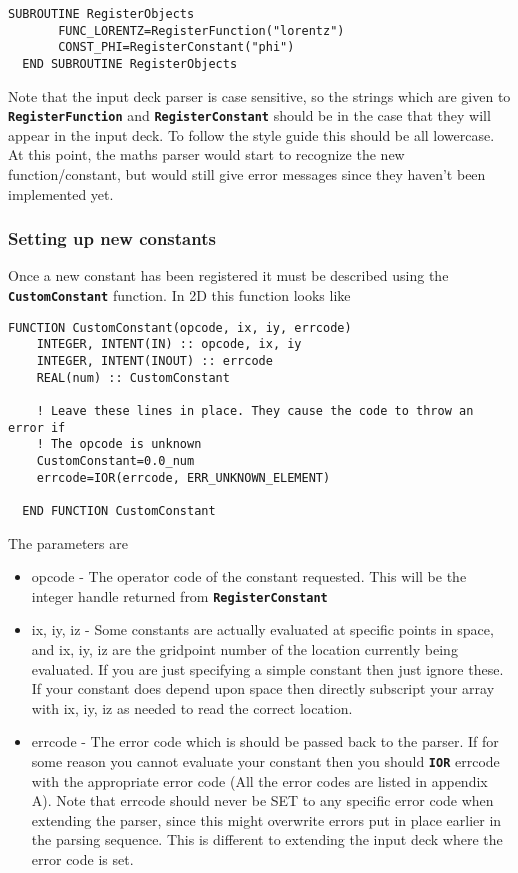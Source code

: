 \documentclass[12pt,a4paper]{article}
\newcommand{\simpleboxverbatim}{\begin{Verbatim}[obeytabs=true,frame=single,
  framerule=0.5mm,rulecolor=\color{warwickmid},formatcom=\color{black}]}
\newcommand{\inlinecode}[1]{{\color{warwickred} \bf\texttt{#1}}}
\newcommand{\EPOCH}{{\color{warwickdark}\fontfamily{phv}\selectfont{EPOCH}}}
\begin{document}
\simpleboxverbatim
  SUBROUTINE RegisterObjects
       FUNC_LORENTZ=RegisterFunction("lorentz")
       CONST_PHI=RegisterConstant("phi")
  END SUBROUTINE RegisterObjects
\end{Verbatim}

Note that the input deck parser is case sensitive, so the strings which are
given to \inlinecode{RegisterFunction} and \inlinecode{RegisterConstant}
should be in the case that they will appear in the input deck. To follow the
{\EPOCH} style guide this should be all lowercase. At this point, the maths
parser would start to recognize the new function/constant, but would still
give error messages since they haven't been implemented yet.

\subsubsection{Setting up new constants}

Once a new constant has been registered it must be described using the
\inlinecode{CustomConstant} function. In 2D this function looks like

\simpleboxverbatim
  FUNCTION CustomConstant(opcode, ix, iy, errcode)
    INTEGER, INTENT(IN) :: opcode, ix, iy
    INTEGER, INTENT(INOUT) :: errcode
    REAL(num) :: CustomConstant

    ! Leave these lines in place. They cause the code to throw an error if
    ! The opcode is unknown
    CustomConstant=0.0_num
    errcode=IOR(errcode, ERR_UNKNOWN_ELEMENT)

  END FUNCTION CustomConstant
\end{Verbatim}

The parameters are

\begin{itemize}
\item opcode - The operator code of the constant requested. This will be the
  integer handle returned from \inlinecode{RegisterConstant}
\item ix, iy, iz - Some constants are actually evaluated at specific points in
  space, and ix, iy, iz are the gridpoint number of the location currently being
  evaluated. If you are just specifying a simple constant then just ignore
  these. If your constant does depend upon space then directly subscript your
  array with ix, iy, iz as needed to read the correct location.
\item errcode - The error code which is should be passed back to the
  parser. If for some reason you cannot evaluate your constant then you should
  \inlinecode{IOR} errcode with the appropriate error code (All the error
  codes are listed in appendix A). Note that errcode should never be SET to
  any specific error code when extending the parser, since this might
  overwrite errors put in place earlier in the parsing sequence. This is
  different to extending the input deck where the error code is set.
\end{itemize}
\end{document}
